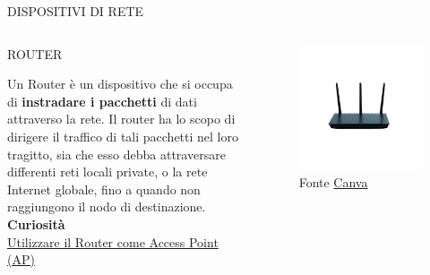 \documentclass[aspectratio=1610,handout]{beamer}
\begin{document}
\begin{frame}{DISPOSITIVI DI RETE}
    \begin{columns}
            \justifying
            \begin{alertblock}{ROUTER}
                \begin{minipage}{0.96\linewidth}
                    \justifying
                    Un Router è un dispositivo che si occupa di \textbf{instradare i pacchetti} di dati attraverso la rete. 
                    Il router ha lo scopo di dirigere il traffico di tali pacchetti nel loro tragitto, 
                    sia che esso debba attraversare differenti reti locali private, o la rete Internet 
                    globale, fino a quando non raggiungono il nodo di destinazione.\\
                    \bigskip
                    \tiny{\textbf{Curiosità}}\\
                    \tiny{\href{https://www.fastweb.it/fastweb-plus/digital-magazine/come-trasformare-il-vecchio-router-in-un-access-point-wireless/}{Utilizzare il Router come Access Point (AP)}}
                \end{minipage}
            \end{alertblock}
            \begin{figure}
                \includegraphics[width=\linewidth]{img/modemrouter.png}
                \caption{{Fonte \href{https://www.canva.com/}{Canva}}}
            \end{figure}
    \end{columns}
\end{frame}
\end{document}
